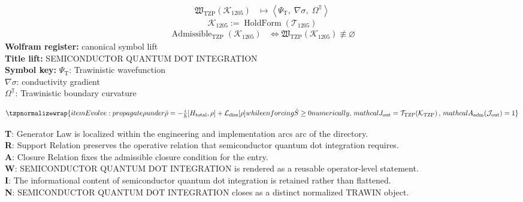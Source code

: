 \noindent
\begin{minipage}[t]{0.48\linewidth}
\begingroup
\small
\[
\begin{aligned}
\mathfrak{W}_{\mathrm{TZP}}\!\left(\mathcal{K}_{1205}\right)
&\longmapsto
\left\langle \Psi_{\mathrm{T}},\; \nabla\sigma,\; \Omega^{\mathbb{T}} \right\rangle
\end{aligned}
\]
\[
\mathcal{K}_{1205}
:=
\operatorname{HoldForm}\!\left(\mathcal{T}_{1205}\right)
\]
\[
\begin{aligned}
\operatorname{Admissible}_{\mathrm{TZP}}\!\left(\mathcal{K}_{1205}\right)
&\Longleftrightarrow
\mathfrak{W}_{\mathrm{TZP}}\!\left(\mathcal{K}_{1205}\right)\not\equiv\varnothing
\end{aligned}
\]
\textbf{Wolfram register:} canonical symbol lift\\
\textbf{Title lift:} SEMICONDUCTOR QUANTUM DOT INTEGRATION\\
\textbf{Symbol key:} \(\Psi_{\mathrm{T}}\): Trawinistic wavefunction\\ \(\nabla\sigma\): conductivity gradient\\ \(\Omega^{\mathbb{T}}\): Trawinistic boundary curvature
\par
\endgroup
\end{minipage}\hfill
\begin{minipage}[t]{0.48\linewidth}
\[
\tzpnormalizewrap{item Evolve: propagate \rho under \dot\rho = -\tfrac{i}{\hbar}[H_{\rm total},\rho]+\mathcal L_{\rm diss}[\rho] while enforcing \dot S\ge 0 numerically,\,mathcal{J}_{\mathrm{out}} = \mathcal{T}_{\mathrm{TZP}}\!\left(\mathcal{K}_{\mathrm{TZP}}\right),\,mathcal{A}_{\mathrm{adm}}\!\left(\mathcal{J}_{\mathrm{out}}\right)=1}
\]

\small
\textbf{T}: Generator Law is localized within the engineering and implementation arcs arc of the directory.\\
\textbf{R}: Support Relation preserves the operative relation that semiconductor quantum dot integration requires.\\
\textbf{A}: Closure Relation fixes the admissible closure condition for the entry.\\
\textbf{W}: SEMICONDUCTOR QUANTUM DOT INTEGRATION is rendered as a reusable operator-level statement.\\
\textbf{I}: The informational content of semiconductor quantum dot integration is retained rather than flattened.\\
\textbf{N}: SEMICONDUCTOR QUANTUM DOT INTEGRATION closes as a distinct normalized TRAWIN object.
\normalsize
\end{minipage}

